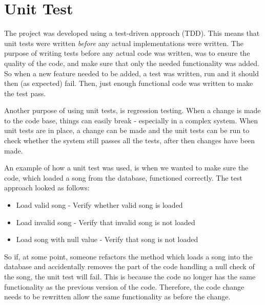 \section{Unit Test}

The project was developed using a test-driven approach (TDD). This means that unit tests were written \textit{before} any actual implementations were written. The purpose of writing tests before any actual code was written, was to ensure the quality of the code, and make sure that only the needed functionality was added. So when a new feature needed to be added, a test was written, run and it should then (as expected) fail. Then, just enough functional code was written to make the test pass. 

Another purpose of using unit tests, is regression testing. When a change is made to the code base, things can easily break - especially in a complex system. When unit tests are in place, a change can be made and the unit tests can be run to check whether the system still passes all the tests, after then changes have been made. 

An example of how a unit test was used, is when we wanted to make sure the code, which loaded a song from the database, functioned correctly. The test approach looked as follows:

\begin{itemize}
\item Load valid song
\subitem- Verify whether valid song is loaded
\item Load invalid song
\subitem- Verify that invalid song is not loaded
\item Load song with null value
\subitem- Verify that song is not loaded
\end{itemize} 

So if, at some point, someone refactors the method which loads a song into the database and accidentally removes the part of the code handling a null check of the song, the unit test will fail. This is because the code no longer has the same functionality as the previous version of the code. Therefore, the code change needs to be rewritten allow the same functionality as before the change.


